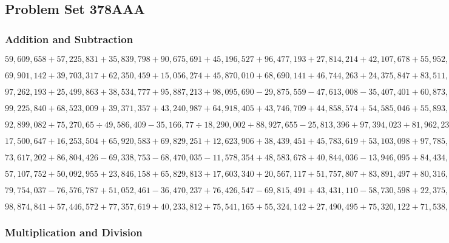 \hypertarget{problem-set-378aaa}{%
\subsection{Problem Set 378AAA}\label{problem-set-378aaa}}

\hypertarget{addition-and-subtraction}{%
\subsubsection{Addition and
Subtraction}\label{addition-and-subtraction}}

\(59,609,658+57,225,831+35,839,798+90,675,691+45,196,527+96,477,193+27,814,214+42,107,678+55,952,918+44,879,486\)

\(69,901,142+39,703,317+62,350,459+15,056,274+45,870,010+68,690,141+46,744,263+24,375,847+83,511,863+95,349,197\)

\(97,262,193+25,499,863+38,534,777+95,887,213+98,095,690-29,875,559-47,613,008-35,407,401+60,873,813-23,848,981\)

\(99,225,840+68,523,009+39,371,357+43,240,987+64,918,405+43,746,709+44,858,574+54,585,046+55,893,466+44,739,915\)

\(92,899,082+75,270,65÷49,586,409-35,166,77÷18,290,002+88,927,655-25,813,396+97,394,023+81,962,239+64,403,890\)

\(17,500,647+16,253,504+65,920,583+69,829,251+12,623,906+38,439,451+45,783,619+53,103,098+97,785,840+19,307,591\)

\(73,617,202+86,804,426-69,338,753-68,470,035-11,578,354+48,583,678+40,844,036-13,946,095+84,434,975+82,245,872\)

\(57,107,752+50,092,955+23,846,158+65,829,813+17,603,340+20,567,117+51,757,807+83,891,497+80,316,874+23,977,347\)

\(79,754,037-76,576,787+51,052,461-36,470,237+76,426,547-69,815,491+43,431,110-58,730,598+22,375,130+18,612,811\)

\(98,874,841+57,446,572+77,357,619+40,233,812+75,541,165+55,324,142+27,490,495+75,320,122+71,538,675+66,314,557\)

\hypertarget{multiplication-and-division}{%
\subsubsection{Multiplication and
Division}\label{multiplication-and-division}}

